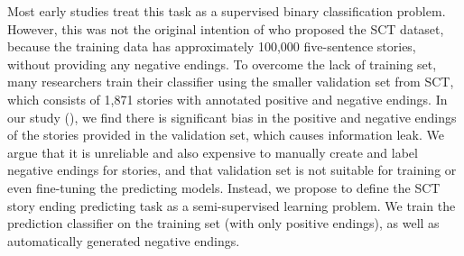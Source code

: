 
Most early studies treat this task as a supervised binary classification problem.
However, this was not the original intention
of  who proposed the SCT dataset, 
because the training data has approximately 100,000 five-sentence stories,
without providing any negative endings.
To overcome the lack of training set, many researchers train their classifier using
the smaller validation set from SCT, 
which consists of 1,871 stories with annotated positive and negative endings.
In our study (), we find there is significant bias in
the positive and negative endings of the stories provided in the validation
set, which causes information leak.
We argue that it is unreliable and also expensive to manually create and
label negative endings for stories,
and that validation set is not suitable for training
or even fine-tuning the predicting models.
Instead, we propose to define the SCT story ending predicting task as a
semi-supervised learning problem. We train the prediction classifier on
the training set (with only positive endings),
as well as automatically generated negative endings.

